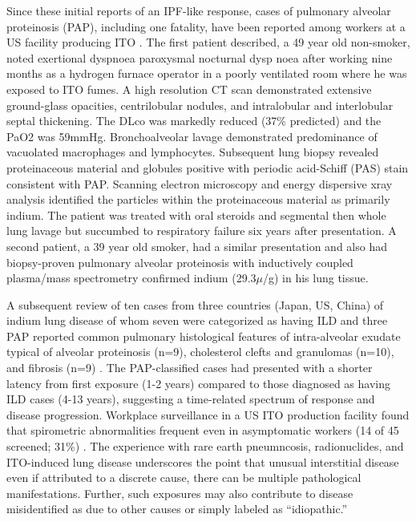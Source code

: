 \documentclass[a4
er,12pt]{article}
\begin{document}
Since these initial reports of an IPF-like response, cases of pulmonary alveolar proteinosis (PAP), including one fatality, have been reported among workers at a US facility producing ITO \cite{Cummings2010}. The first patient described, a 49 year old non-smoker, noted exertional dyspnoea paroxysmal nocturnal dysp noea after working nine months as a hydrogen furnace operator in a poorly ventilated room where he was exposed to ITO fumes. A high resolution CT scan demonstrated extensive ground-glass opacities, centrilobular nodules, and intralobular and interlobular septal thickening. The DLco was markedly reduced (37\% predicted) and the PaO2 was 59mmHg. Bronchoalveolar lavage demonstrated predominance of vacuolated macrophages and lymphocytes. Subsequent lung biopsy revealed proteinaceous material and globules positive with periodic acid-Schiff (PAS) stain consistent with PAP. Scanning electron microscopy and energy dispersive xray analysis identified the particles within the proteinaceous material as primarily indium. The patient was treated with oral steroids and segmental then whole lung lavage but succumbed to respiratory failure six years after presentation. A second patient, a 39 year old smoker, had a similar presentation and also had biopsy-proven pulmonary alveolar proteinosis with inductively coupled plasma/mass spectrometry confirmed indium (29.3\ensuremath{\mu}/g) in his lung tissue. 

A subsequent review of ten cases from three countries (Japan, US, China) of indium lung disease of whom seven were categorized as having ILD and three PAP reported common pulmonary histological features of intra-alveolar exudate typical of alveolar proteinosis (n=9), cholesterol clefts and granulomas (n=10), and fibrosis (n=9) \cite{Cummings2012}. The PAP-classified cases had presented with a shorter latency from first exposure (1-2 years) compared to those diagnosed as having ILD cases (4-13 years), suggesting a time-related spectrum of response and disease progression. Workplace surveillance in a US ITO production facility found that spirometric abnormalities frequent even in asymptomatic workers (14 of 45 screened; 31\%) \cite{Cummings2013}. 
The experience with rare earth pneumncosis, radionuclides, and ITO-induced lung disease underscores the point that unusual interstitial disease even if attributed to a discrete cause, there can be multiple pathological manifestations. Further, such exposures may also contribute to disease misidentified as due to other causes or simply labeled as “idiopathic.”    
\end{document}
